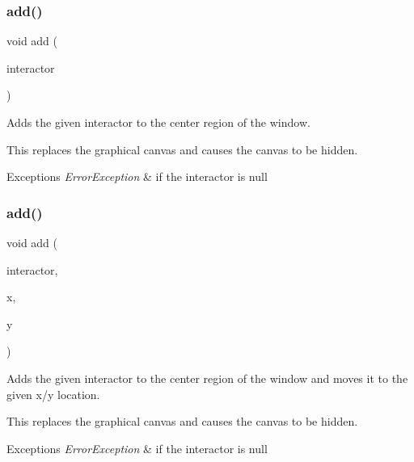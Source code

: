 \subsubsection{\texorpdfstring{add()}{add()}\hspace{0.1cm}{\footnotesize\ttfamily [1/8]}}
{\footnotesize\ttfamily void add (\begin{DoxyParamCaption}\item[{\mbox{\hyperlink{classsgl_1_1GInteractor}{G\+Interactor}} $\ast$}]{interactor }\end{DoxyParamCaption})\hspace{0.3cm}{\ttfamily [virtual]}}



Adds the given interactor to the center region of the window. 

This replaces the graphical canvas and causes the canvas to be hidden. 
\begin{DoxyExceptions}{Exceptions}
{\em Error\+Exception} & if the interactor is null \\
\hline
\end{DoxyExceptions}
\mbox{\label{classsgl_1_1GWindow_aca25fb0fc7d200e9c4fd23830d2d413d}} 
\subsubsection{\texorpdfstring{add()}{add()}\hspace{0.1cm}{\footnotesize\ttfamily [2/8]}}
{\footnotesize\ttfamily void add (\begin{DoxyParamCaption}\item[{\mbox{\hyperlink{classsgl_1_1GInteractor}{G\+Interactor}} $\ast$}]{interactor,  }\item[{double}]{x,  }\item[{double}]{y }\end{DoxyParamCaption})\hspace{0.3cm}{\ttfamily [virtual]}}



Adds the given interactor to the center region of the window and moves it to the given x/y location. 

This replaces the graphical canvas and causes the canvas to be hidden. 
\begin{DoxyExceptions}{Exceptions}
{\em Error\+Exception} & if the interactor is null \\
\hline
\end{DoxyExceptions}
\mbox{\label{classsgl_1_1GWindow_a33b08fe5428ed634a658deab076099f7}} 
